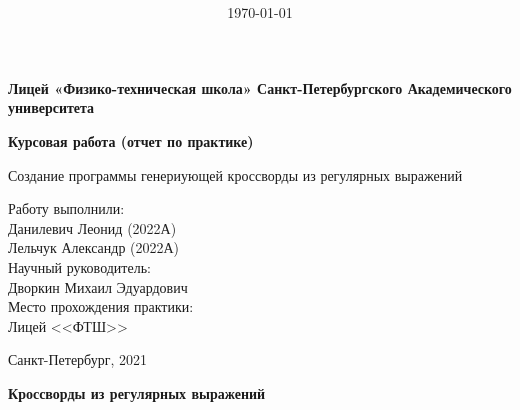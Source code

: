 \documentclass[12pt]{article}
\title{\bf \ReportTheme}
\author{\it \ReportAuthor}
\date{\today}
\begin{document}

    \begin{center}
    \large { {\bf Лицей «Физико-техническая школа»  Санкт-Петербургского Академического университета   } } 
    
    \vspace*{6\baselineskip}
    
    \large { {\bf Курсовая работа (отчет по практике) } } 
    
    \vspace*{6\baselineskip}
    
    Создание программы генериующей кроссворды из регулярных выражений \\
    \vspace*{3\baselineskip}
    
    \end{center}        
    \begin{flushright}
        Работу выполнили: \\
        Данилевич Леонид (2022А) \\
        Лельчук Александр (2022А) \\
        Научный руководитель: \\
        Дворкин Михаил Эдуардович \\
        Место прохождения практики: \\
        Лицей <<ФТШ>>
    \end{flushright}
    \vspace*{5\baselineskip}
    \begin{center}
        Санкт-Петербург, 2021
    \end{center}        
    \newpage %
    
    \newpage %
    { \center \bf Кроссворды из регулярных выражений }
\tableofcontents
    \newpage %
\end{document}
